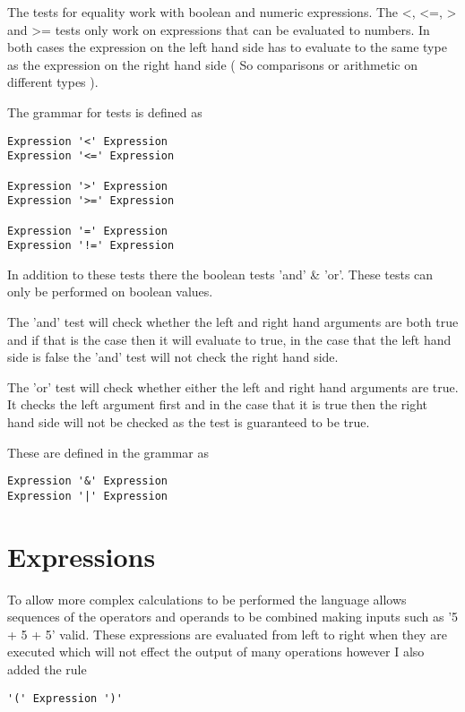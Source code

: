 \documentclass[]{final_report}
\begin{document}
The tests for equality work with boolean and numeric expressions. The \textless, \textless=, \textgreater \vspace{1pt} and \textgreater= tests only work on expressions that can be evaluated to numbers. In both cases the expression on the left hand side has to evaluate to the same type as the expression on the right hand side ( So comparisons or arithmetic on different types  ).

The grammar for tests is defined as

\begin {verbatim}
Expression '<' Expression
Expression '<=' Expression

Expression '>' Expression
Expression '>=' Expression

Expression '=' Expression
Expression '!=' Expression
\end{verbatim}

In addition to these tests there the boolean tests 'and' \& 'or'. These tests can only be performed on boolean values.
 
The 'and' test will check whether the left and right hand arguments are both true and if that is the case then it will evaluate to true, in the case that the left hand side is false the 'and' test will not check the right hand side. 

The 'or' test will check whether either the left and right hand arguments are true. It checks the left argument first and in the case that it is true then the right hand side will not be checked as the test is guaranteed to be true.

These are defined in the grammar as

\begin {verbatim}
Expression '&' Expression
Expression '|' Expression
\end{verbatim}

\section{Expressions}

To allow more complex calculations to be performed the language allows sequences of the operators and operands to be combined making inputs such as '5 + 5 + 5' valid. These expressions are evaluated from left to right when they are executed which will not effect the output of many operations however I also added the rule

\begin{verbatim}
'(' Expression ')'
\end{verbatim}
\end{document}
